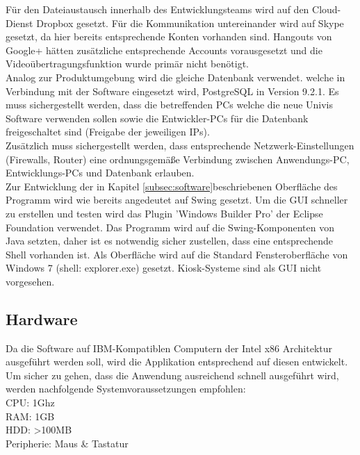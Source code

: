 Für den Dateiaustausch innerhalb des Entwicklungsteams wird auf den Cloud-Dienst Dropbox gesetzt.
Für die Kommunikation untereinander wird auf Skype gesetzt, da hier bereits entsprechende Konten vorhanden sind. Hangouts von Google+ hätten zusätzliche entsprechende Accounts vorausgesetzt und die Videoübertragungsfunktion wurde primär nicht benötigt.\\

Analog zur Produktumgebung wird die gleiche Datenbank verwendet. welche in Verbindung mit der Software eingesetzt wird, PostgreSQL in Version 9.2.1.
Es muss sichergestellt werden, dass die betreffenden PCs welche die neue Univis Software verwenden sollen sowie die Entwickler-PCs für die Datenbank freigeschaltet sind (Freigabe der jeweiligen IPs).\\

Zusätzlich muss sichergestellt werden, dass entsprechende Netzwerk-Einstellungen (Firewalls, Router) eine ordnungsgemäße Verbindung zwischen Anwendungs-PC, Entwicklungs-PCs und Datenbank erlauben.\\

Zur Entwicklung der in Kapitel \ref{subsec:software}beschriebenen Oberfläche des Programm wird wie bereits angedeutet auf Swing gesetzt. Um die GUI schneller zu erstellen und testen wird das Plugin 'Windows Builder Pro' der Eclipse Foundation verwendet.
Das Programm wird auf die Swing-Komponenten von Java setzten, daher ist es notwendig sicher zustellen, dass eine entsprechende Shell vorhanden ist.
Als Oberfläche wird auf die Standard Fensteroberfläche von Windows 7 (shell: explorer.exe) gesetzt. Kiosk-Systeme sind als GUI nicht vorgesehen. \\

\subsection{Hardware}
\label{subsec:devhardware}

Da die Software auf IBM-Kompatiblen Computern der Intel x86 Architektur ausgeführt werden soll, wird die Applikation entsprechend auf diesen entwickelt.
Um sicher zu gehen, dass die Anwendung ausreichend schnell ausgeführt wird, werden nachfolgende Systemvoraussetzungen empfohlen:\\

CPU: 1Ghz\\
RAM: 1GB\\
HDD: >100MB\\
Peripherie: Maus \& Tastatur\\

